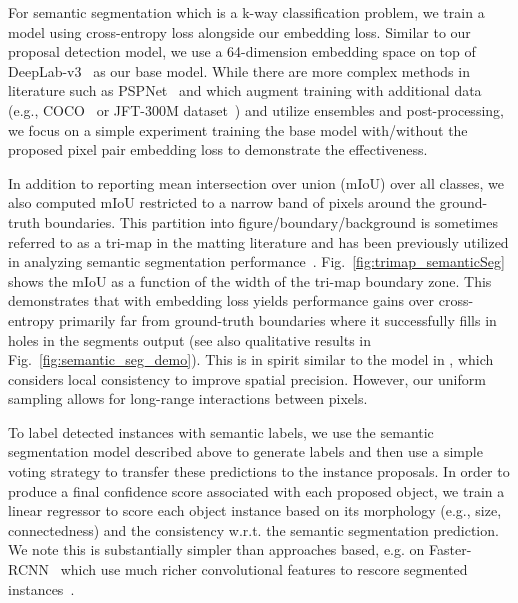 \documentclass[10pt,twocolumn,letterpaper]{article}
\begin{document}
For semantic segmentation which is a k-way classification problem, we train a
model using cross-entropy loss alongside our embedding loss.  Similar to our
proposal detection model, we use a 64-dimension embedding space on top of
DeepLab-v3~\cite{chen2017rethinking} as our base model.  While there are more
complex methods in literature such as PSPNet~\cite{zhao2016pyramid} and which
augment training with additional data (e.g., COCO~\cite{lin2014microsoft} or
JFT-300M dataset~\cite{sun2017revisiting}) and utilize ensembles and
post-processing, we focus on a simple experiment training the base model
with/without the proposed pixel pair embedding loss to demonstrate the
effectiveness. 

In addition to reporting mean intersection over union (mIoU) over all
classes,
we also computed mIoU restricted to a narrow band of pixels around the
ground-truth boundaries.  This partition into figure/boundary/background is
sometimes referred to as a tri-map in the matting literature and has been
previously utilized in analyzing semantic segmentation
performance~\cite{kohli2009robust, chen2016deeplab, ghiasi2016laplacian}.
Fig.~\ref{fig:trimap_semanticSeg} shows the mIoU as a function of the width
of the tri-map boundary zone.  This demonstrates that with embedding loss
yields performance gains over cross-entropy primarily far from ground-truth
boundaries where it successfully fills in holes in the segments output
(see also qualitative results in Fig.~\ref{fig:semantic_seg_demo}).
This is in spirit similar to the model in \cite{harley2017segmentation},
which considers local consistency to improve spatial precision.
However, our uniform sampling allows for long-range interactions between pixels.


To label detected instances with semantic labels, we use the semantic
segmentation model described above to generate labels and then use a simple
voting strategy to transfer these predictions to the instance proposals.  In
order to produce a final confidence score associated with each proposed object,
we train a linear regressor to score each object instance based on its
morphology (e.g., size, connectedness) and the consistency w.r.t. the semantic
segmentation prediction. We note this is substantially simpler than approaches
based, e.g. on Faster-RCNN~\cite{ren2015faster} which use much richer convolutional features to
rescore segmented instances~\cite{he2017mask}.
\end{document}
